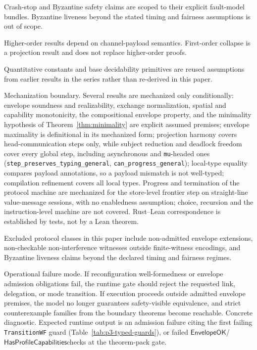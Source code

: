 \documentclass[a4paper,10pt,twocolumn,english]{article}
\numberwithin{equation}{section}
\theoremstyle{paperdef}
\theoremstyle{paperplain}
\theoremstyle{paperdef}
\theoremstyle{paperremark}
\theoremstyle{paperdef}
\newcommand{\EnvelopeOK}{\ensuremath{\mathsf{EnvelopeOK}}}
\newcommand{\HasProfileCapabilities}{\ensuremath{\mathsf{HasProfileCapabilities}}}
\begin{document}
Crash-stop and Byzantine safety claims are scoped to their explicit fault-model bundles. Byzantine liveness beyond the stated timing and fairness assumptions is out of scope.

Higher-order results depend on channel-payload semantics. First-order collapse is a projection result and does not replace higher-order proofs.

Quantitative constants and base decidability primitives are reused assumptions from earlier results in the series rather than re-derived in this paper.

Mechanization boundary. Several results are mechanized only conditionally:
envelope soundness and realizability, exchange normalization, spatial and
capability monotonicity, the compositional envelope property, and the
minimality hypothesis of Theorem~\ref{thm:minimality} are explicit assumed
premises; envelope maximality is definitional in its mechanized form; projection
harmony covers head-communication steps only, while subject reduction and
deadlock freedom cover every global step, including asynchronous and
\texttt{mu}-headed ones (\nolinkurl{step_preserves_typing_general},
\nolinkurl{can_progress_general}); local-type equality compares payload
annotations, so a payload mismatch is not well-typed; compilation refinement
covers all local types. Progress and termination of the protocol machine are
mechanized for the store-level frontier step on straight-line value-message
sessions, with no enabledness assumption; choice, recursion and the
instruction-level machine are not covered. Rust--Lean correspondence is
established by tests, not by a Lean theorem.

Excluded protocol classes in this paper include non-admitted envelope
extensions, non-checkable non-interference witnesses outside finite-witness
encodings, and Byzantine liveness claims beyond the declared timing and
fairness regimes.

Operational failure mode. If reconfiguration well-formedness or envelope
admission obligations fail, the runtime gate should reject the requested link,
delegation, or mode transition. If execution proceeds outside admitted envelope
premises, the model no longer guarantees safety-visible equivalence, and strict
counterexample families from the boundary theorems become reachable.
Concrete diagnostic. Expected runtime output is an admission failure citing the
first failing \texttt{TransitionWF} guard (Table~\ref{tab:p3-typed-guards}),
or failed \EnvelopeOK/\HasProfileCapabilities checks at the theorem-pack gate.
\end{document}
